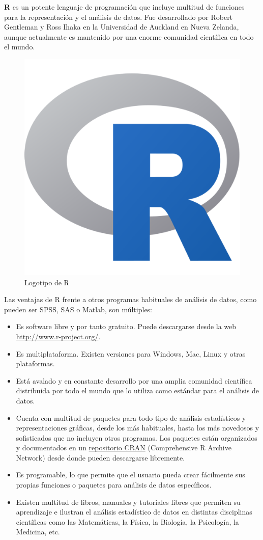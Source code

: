 \documentclass[
  a4paper,
]{scrreport}
\providecommand{\tightlist}{%
  \setlength{\itemsep}{0pt}\setlength{\parskip}{0pt}}\usepackage{longtable,booktabs,array}
\theoremstyle{definition}
\theoremstyle{remark}
\begin{document}
\textbf{R} es un potente lenguaje de programación que incluye multitud
de funciones para la representación y el análisis de datos. Fue
desarrollado por Robert Gentleman y Ross Ihaka en la Universidad de
Auckland en Nueva Zelanda, aunque actualmente es mantenido por una
enorme comunidad científica en todo el mundo.

\begin{figure}[H]

{\centering \includegraphics[width=0.25\linewidth,height=\textheight,keepaspectratio]{img/logos/Rlogo.png}

}

\caption{Logotipo de R}

\end{figure}%

Las ventajas de R frente a otros programas habituales de análisis de
datos, como pueden ser SPSS, SAS o Matlab, son múltiples:

\begin{itemize}
\tightlist
\item
  Es software libre y por tanto gratuito. Puede descargarse desde la web
  \url{http://www.r-project.org/}.
\item
  Es multiplataforma. Existen versiones para Windows, Mac, Linux y otras
  plataformas.
\item
  Está avalado y en constante desarrollo por una amplia comunidad
  científica distribuida por todo el mundo que lo utiliza como estándar
  para el análisis de datos.
\item
  Cuenta con multitud de paquetes para todo tipo de análisis
  estadísticos y representaciones gráficas, desde los más habituales,
  hasta los más novedosos y sofisticados que no incluyen otros
  programas. Los paquetes están organizados y documentados en un
  \href{https://cran.r-project.org/}{repositorio CRAN} (Comprehensive R
  Archive Network) desde donde pueden descargarse libremente.
\item
  Es programable, lo que permite que el usuario pueda crear fácilmente
  sus propias funciones o paquetes para análisis de datos específicos.
\item
  Existen multitud de libros, manuales y tutoriales libres que permiten
  su aprendizaje e ilustran el análisis estadístico de datos en
  distintas disciplinas científicas como las Matemáticas, la Física, la
  Biología, la Psicología, la Medicina, etc.
\end{itemize}
\end{document}
